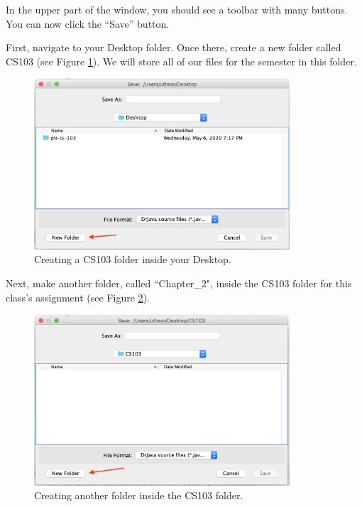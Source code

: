 In the upper part of the window, you should see a toolbar with many buttons.
You can now click the ``Save'' button. 

First, navigate to your Desktop folder. Once there, create a new folder called CS103 (see Figure \ref{fig:helloworld:sec:saving}). We will store all of our files for the semester in this folder. 

\begin{figure}[ht]
	\centering
	\includegraphics[width=0.85\textwidth]{images/hello_world_saving}
	\caption{Creating a CS103 folder inside your Desktop.}
	\label{fig:helloworld:sec:saving}
\end{figure}

Next, make another folder, called ``Chapter\_2", inside the CS103 folder for this class's assignment (see Figure \ref{fig:helloworld:sec:saving2}).

\begin{figure}[ht]
	\centering
	\includegraphics[width=0.85\textwidth]{images/hello_world_saving2}
	\caption{Creating another folder inside the CS103 folder.}
	\label{fig:helloworld:sec:saving2}
\end{figure}

